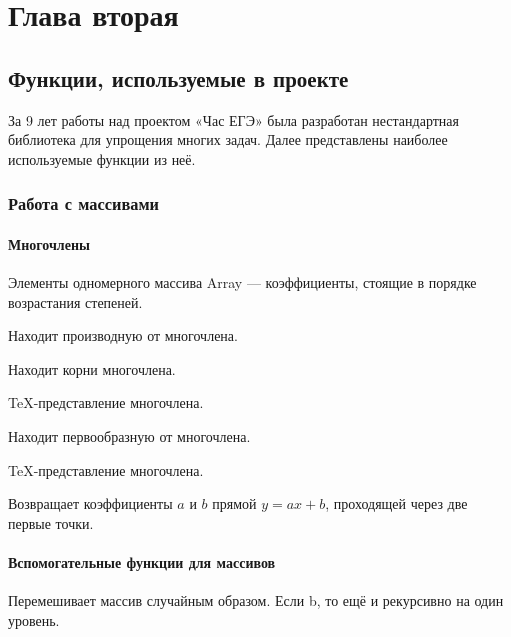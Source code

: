 \section{Глава вторая}\label{2sect}
\subsection{Функции, используемые в проекте}
За 9 лет работы над проектом «Час ЕГЭ» была разработан нестандартная библиотека для упрощения многих задач. Далее представлены наиболее используемые функции из неё.

\subsubsection*{Работа с массивами}

\paragraph*{Многочлены}

Элементы одномерного массива Array --- коэффициенты, стоящие в порядке возрастания степеней.


Находит производную от многочлена.


Находит корни многочлена.


TeX-представление многочлена.%


Находит первообразную от многочлена.%


TeX-представление многочлена.


Возвращает коэффициенты $a$ и $b$ прямой $y=ax+b$, проходящей через две первые точки.

\paragraph*{Вспомогательные функции для массивов}


Перемешивает массив случайным образом. Если b, то ещё и рекурсивно на один уровень.

